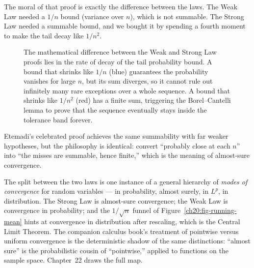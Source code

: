 The moral of that proof is exactly the difference between the laws. The Weak Law needed a $1/n$ bound (variance over $n$), which is not summable. The Strong Law needed a summable bound, and we bought it by spending a fourth moment to make the tail decay like $1/n^2$.

\begin{figure}[htbp]
\centering
{}
\caption{The mathematical difference between the Weak and Strong Law proofs lies in the rate of decay of the tail probability bound. A bound that shrinks like $1/n$ (blue) guarantees the probability vanishes for large $n$, but its sum diverges, so it cannot rule out infinitely many rare exceptions over a whole sequence. A bound that shrinks like $1/n^2$ (red) has a finite sum, triggering the Borel--Cantelli lemma to prove that the sequence eventually stays inside the tolerance band forever.}
\label{ch20:fig-summability}
\end{figure}

Etemadi's celebrated proof achieves the same summability with far weaker hypotheses, but the philosophy is identical: convert ``probably close at each $n$'' into ``the misses are summable, hence finite,'' which is the meaning of almost-sure convergence.

\begin{connectionbox}
The split between the two laws is one instance of a general hierarchy of \emph{modes of convergence} for random variables --- in probability, almost surely, in $L^p$, in distribution. The Strong Law is almost-sure convergence; the Weak Law is convergence in probability; and the $1/\sqrt n$ funnel of Figure~\ref{ch20:fig-running-mean} hints at convergence in distribution after rescaling, which is the Central Limit Theorem. The companion calculus book's treatment of pointwise versus uniform convergence is the deterministic shadow of the same distinctions: ``almost sure'' is the probabilistic cousin of ``pointwise,'' applied to functions on the sample space. Chapter~22 draws the full map.
\end{connectionbox}

